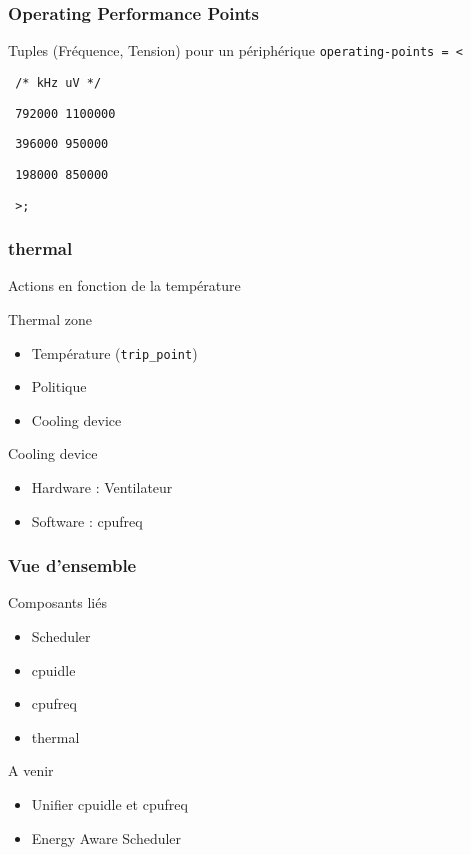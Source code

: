 \begin{frame}
	\frametitle{Operating Performance Points}
	\begin{block}{Tuples (Fréquence, Tension) pour un périphérique}
	\texttt{operating-points = <}

	\texttt{     /* kHz    uV */}

	\texttt{     792000  1100000}

	\texttt{     396000  950000}

	\texttt{     198000  850000}

	\texttt{     >;}
	\end{block}
\end{frame}
\begin{frame}
	\frametitle{thermal}
	Actions en fonction de la température
	\begin{block}{Thermal zone}
		\begin{itemize}
			\item Température (\texttt{trip\_point})
			\item Politique 
			\item Cooling device
		\end{itemize}
	\end{block}
	\begin{block}{Cooling device}
		\begin{itemize}
			\item Hardware : Ventilateur
			\item Software : cpufreq
		\end{itemize}
	\end{block}
\end{frame}


\begin{frame}
	\frametitle{Vue d'ensemble}
	\begin{block}{Composants liés}
		\begin{itemize}
			\item Scheduler
			\item cpuidle
			\item cpufreq
			\item thermal
		\end{itemize}
	\end{block}
	\begin{block}{A venir}
		\begin{itemize}
			\item Unifier cpuidle et cpufreq
			\item Energy Aware Scheduler
		\end{itemize}
	\end{block}
\end{frame}
